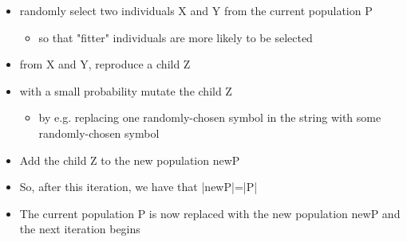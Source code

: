 \documentclass{article}[18pt]
\begin{document}
\begin{itemize}
	\item randomly select two individuals X and Y from the current population P
	\begin{itemize}
		\item so that "fitter" individuals are more likely to be selected
	\end{itemize}
	\item from X and Y, reproduce a child Z
	\item with a small probability mutate the child Z
	\begin{itemize}
		\item by e.g. replacing one randomly-chosen symbol in the string with some randomly-chosen symbol
	\end{itemize}
	\item Add the child Z to the new population newP
	\item So, after this iteration, we have that |newP|=|P|
	\item The current population P is now replaced with the new population newP and the next iteration begins
\end{itemize}
\end{document}
